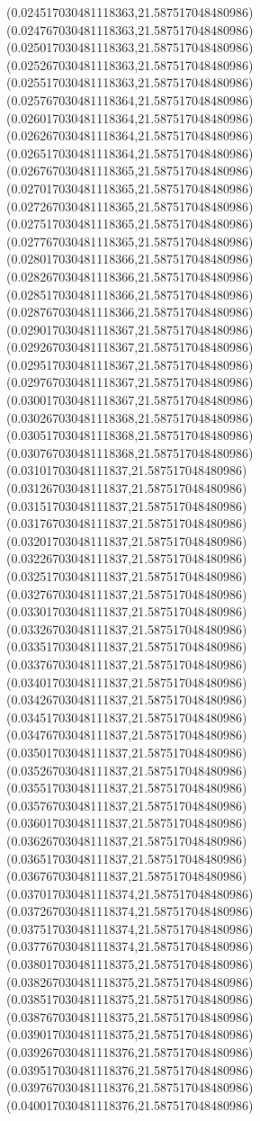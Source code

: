 {(0.024517030481118363,21.587517048480986)
(0.024767030481118363,21.587517048480986)
(0.025017030481118363,21.587517048480986)
(0.025267030481118363,21.587517048480986)
(0.025517030481118363,21.587517048480986)
(0.025767030481118364,21.587517048480986)
(0.026017030481118364,21.587517048480986)
(0.026267030481118364,21.587517048480986)
(0.026517030481118364,21.587517048480986)
(0.026767030481118365,21.587517048480986)
(0.027017030481118365,21.587517048480986)
(0.027267030481118365,21.587517048480986)
(0.027517030481118365,21.587517048480986)
(0.027767030481118365,21.587517048480986)
(0.028017030481118366,21.587517048480986)
(0.028267030481118366,21.587517048480986)
(0.028517030481118366,21.587517048480986)
(0.028767030481118366,21.587517048480986)
(0.029017030481118367,21.587517048480986)
(0.029267030481118367,21.587517048480986)
(0.029517030481118367,21.587517048480986)
(0.029767030481118367,21.587517048480986)
(0.030017030481118367,21.587517048480986)
(0.030267030481118368,21.587517048480986)
(0.030517030481118368,21.587517048480986)
(0.030767030481118368,21.587517048480986)
(0.03101703048111837,21.587517048480986)
(0.03126703048111837,21.587517048480986)
(0.03151703048111837,21.587517048480986)
(0.03176703048111837,21.587517048480986)
(0.03201703048111837,21.587517048480986)
(0.03226703048111837,21.587517048480986)
(0.03251703048111837,21.587517048480986)
(0.03276703048111837,21.587517048480986)
(0.03301703048111837,21.587517048480986)
(0.03326703048111837,21.587517048480986)
(0.03351703048111837,21.587517048480986)
(0.03376703048111837,21.587517048480986)
(0.03401703048111837,21.587517048480986)
(0.03426703048111837,21.587517048480986)
(0.03451703048111837,21.587517048480986)
(0.03476703048111837,21.587517048480986)
(0.03501703048111837,21.587517048480986)
(0.03526703048111837,21.587517048480986)
(0.03551703048111837,21.587517048480986)
(0.03576703048111837,21.587517048480986)
(0.03601703048111837,21.587517048480986)
(0.03626703048111837,21.587517048480986)
(0.03651703048111837,21.587517048480986)
(0.03676703048111837,21.587517048480986)
(0.037017030481118374,21.587517048480986)
(0.037267030481118374,21.587517048480986)
(0.037517030481118374,21.587517048480986)
(0.037767030481118374,21.587517048480986)
(0.038017030481118375,21.587517048480986)
(0.038267030481118375,21.587517048480986)
(0.038517030481118375,21.587517048480986)
(0.038767030481118375,21.587517048480986)
(0.039017030481118375,21.587517048480986)
(0.039267030481118376,21.587517048480986)
(0.039517030481118376,21.587517048480986)
(0.039767030481118376,21.587517048480986)
(0.040017030481118376,21.587517048480986)
}
